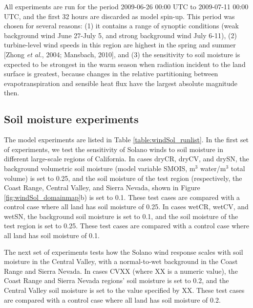 All experiments are run for the period 2009-06-26 00:00 UTC to 2009-07-11 00:00 UTC, and the first 32 hours are discarded as model spin-up.  This period was chosen for several reasons: (1) it contains a range of synoptic conditions (weak background wind June 27-July 5, and strong background wind July 6-11), (2) turbine-level wind speeds in this region are highest in the spring and summer [Zhong \textit{et al.}, 2004; Mansbach, 2010], and (3) the sensitivity to soil moisture is expected to be strongest in the warm season when radiation incident to the land surface is greatest, because changes in the relative partitioning between evapotranspiration and sensible heat flux have the largest absolute magnitude then.

\subsection{Soil moisture experiments}

The model experiments are listed in Table \ref{table:windSol_runlist}.  In the first set of experiments, we test the sensitivity of Solano winds to soil moisture in different large-scale regions of California.  In cases dryCR, dryCV, and drySN, the background volumetric soil moisture (model variable SMOIS, m$^3$ water/m$^3$ total volume) is set to 0.25, and the soil moisture of the test region (respectively, the Coast Range, Central Valley, and Sierra Nevada, shown in Figure \ref{fig:windSol_domainmap}b) is set to 0.1.  These test cases are compared with a control case where all land has soil moisture of 0.25.  In cases wetCR, wetCV, and wetSN, the background soil moisture is set to 0.1, and the soil moisture of the test region is set to 0.25.  These test cases are compared with a control case where all land has soil moisture of 0.1.

The next set of experiments tests how the Solano wind response scales with soil moisture in the Central Valley, with a normal-to-wet background in the Coast Range and Sierra Nevada.  In cases CVXX (where XX is a numeric value), the Coast Range and Sierra Nevada regions' soil moisture is set to 0.2, and the Central Valley soil moisture is set to the value specified by XX.  These test cases are compared with a control case where all land has soil moisture of 0.2.


